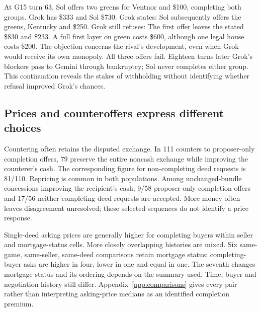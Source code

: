 At G15 turn 63, Sol offers two greens for Ventnor and \$100, completing both groups. Grok has \$333 and Sol \$730. Grok states:
Sol subsequently offers the greens, Kentucky and \$250. Grok still refuses:
The first offer leaves the stated \$830 and \$233. A full first layer on green costs \$600, although one legal house costs \$200. The objection concerns the rival's development, even when Grok would receive its own monopoly. All three offers fail. Eighteen turns later Grok's blockers pass to Gemini through bankruptcy; Sol never completes either group. This continuation reveals the stakes of withholding without identifying whether refusal improved Grok's chances.

\subsection{Prices and counteroffers express different choices}
Countering often retains the disputed exchange. In 111 counters to proposer-only completion offers, 79 preserve the entire noncash exchange while improving the counterer's cash. The corresponding figure for non-completing deed requests is 81/110. Repricing is common in both populations. Among unchanged-bundle concessions improving the recipient's cash, 9/58 proposer-only completion offers and 17/56 neither-completing deed requests are accepted. More money often leaves disagreement unresolved; these selected sequences do not identify a price response.

Single-deed asking prices are generally higher for completing buyers within seller and mortgage-status cells. More closely overlapping histories are mixed. Six same-game, same-seller, same-deed comparisons retain mortgage status: completing-buyer asks are higher in four, lower in one and equal in one. The seventh changes mortgage status and its ordering depends on the summary used. Time, buyer and negotiation history still differ. Appendix~\ref{app:comparisons} gives every pair rather than interpreting asking-price medians as an identified completion premium.


